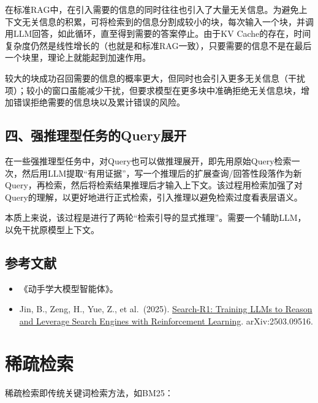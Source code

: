 在标准RAG中，在引入需要的信息的同时往往也引入了大量无关信息。为避免上下文无关信息的积累，可将检索到的信息分割成较小的块，每次输入一个块，并调用LLM回答，如此循环，直至得到需要的答案停止。由于KV Cache的存在，时间复杂度仍然是线性增长的（也就是和标准RAG一致），只要需要的信息不是在最后一个块里，理论上就能起到加速作用。

较大的块成功召回需要的信息的概率更大，但同时也会引入更多无关信息（干扰项）；较小的窗口虽能减少干扰，但要求模型在更多块中准确拒绝无关信息块，增加错误拒绝需要的信息块以及累计错误的风险。

\hypertarget{ux56dbux5f3aux63a8ux7406ux578bux4efbux52a1ux7684queryux5c55ux5f00}{%
\subsection{四、强推理型任务的Query展开}\label{ux56dbux5f3aux63a8ux7406ux578bux4efbux52a1ux7684queryux5c55ux5f00}}

在一些强推理型任务中，对Query也可以做推理展开，即先用原始Query检索一次，然后用LLM提取``有用证据''，写一个推理后的扩展查询/回答性段落作为新Query，再检索，然后将检索结果推理后才输入上下文。该过程用检索加强了对Query的理解，以更好地进行正式检索，引入推理以避免检索过度看表层语义。

本质上来说，该过程是进行了两轮``检索引导的显式推理''。需要一个辅助LLM，以免干扰原模型上下文。

\hypertarget{ux53c2ux8003ux6587ux732e-128}{%
\subsection{参考文献}\label{ux53c2ux8003ux6587ux732e-128}}

\begin{itemize}
\tightlist
\item
  《动手学大模型智能体》。
\item
  Jin, B., Zeng, H., Yue, Z., et al.~(2025). \href{https://arxiv.org/abs/2503.09516}{Search-R1: Training LLMs to Reason and Leverage Search Engines with Reinforcement Learning}. arXiv:2503.09516.
\end{itemize}

\clearpage

\hypertarget{ux7a00ux758fux68c0ux7d22}{%
\section{稀疏检索}\label{ux7a00ux758fux68c0ux7d22}}

稀疏检索即传统关键词检索方法，如BM25：


